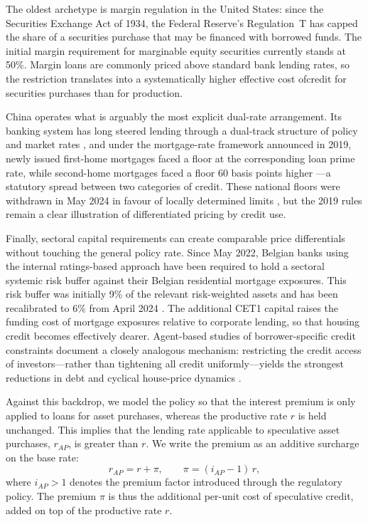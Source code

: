 \documentclass[12pt,a4paper]{article}
\begin{document}
The oldest archetype is margin regulation in the United States: since the Securities Exchange Act of 1934, the Federal Reserve's Regulation~T has capped the share of a securities purchase that may be financed with borrowed funds. The initial margin requirement for marginable equity securities currently stands at 50\%. Margin loans are commonly priced above standard bank lending rates, so the restriction translates into a systematically higher effective cost ofcredit for securities purchases than for production.

China operates what is arguably the most explicit dual-rate arrangement. Its banking system has long steered lending through a dual-track structure of policy and market rates \citep{heDualtrackInterestRates2012}, and under the mortgage-rate framework announced in 2019, newly issued first-home mortgages faced a floor at the corresponding loan prime rate, while second-home mortgages faced a floor 60 basis points higher \citep{peoplesbankofchinaChinaReformIndividual2019}---a statutory spread between two categories of credit. These national floors were withdrawn in May 2024 in favour of locally determined limits \citep{xinhuaChinaAbolishesMortgage2024}, but the 2019 rules remain a clear illustration of differentiated pricing by credit use.

Finally, sectoral capital requirements can create comparable price differentials without touching the general policy rate. Since May 2022, Belgian banks using the internal ratings-based approach have been required to hold a sectoral systemic risk buffer against their Belgian residential mortgage exposures. This risk buffer was initially 9\% of the relevant risk-weighted assets and has been recalibrated to 6\% from April 2024 \citep{nationalbankofbelgiumIntroductionSectoralSystemic2023}. The additional CET1 capital raises the funding cost of mortgage exposures relative to corporate lending, so that housing credit becomes effectively dearer. 
Agent-based studies of borrower-specific credit constraints document a closely analogous mechanism: restricting the credit access of investors---rather than tightening all credit uniformly---yields the strongest reductions in debt and cyclical house-price dynamics \citep{tarneEffectBorrowerspecificLoantovalue2022,tarneRoofRealEstate2025}.

Against this backdrop, we model the policy so that the interest premium is
only applied to loans for asset purchases, whereas the productive rate $r$ is held unchanged.
This implies that the lending rate applicable to speculative asset purchases, $r_{AP}$, is greater
than $r$. We write the premium as an additive surcharge on the base rate:
\[ r_{AP} = r + \pi, \qquad \pi = (i_{AP} - 1)\, r, \]
where $i_{AP} > 1$ denotes the premium factor introduced through the regulatory policy. The premium $\pi$ is thus the additional per-unit cost of speculative credit, added on top of the productive rate $r$.
\end{document}
